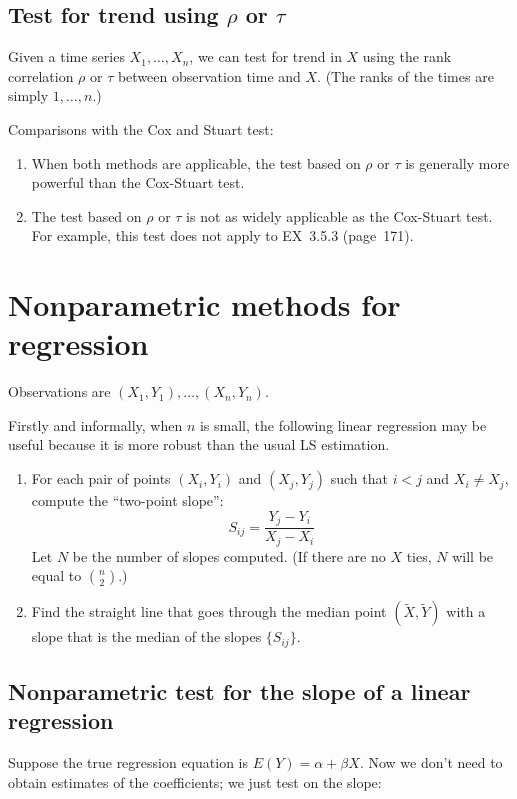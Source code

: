 \documentclass[12pt]{article}
\begin{document}
\subsection{Test for trend using $\rho$ or $\tau$}

Given a time series $X_1,\dotsc,X_n$,
we can test for trend in $X$ using the rank correlation $\rho$ or $\tau$
between observation time and $X$.
(The ranks of the times are simply $1,\dotsc,n$.)

\remark Comparisons with the Cox and Stuart test:
\begin{enumerate}
\item When both methods are applicable, the test based on $\rho$ or
    $\tau$ is generally more powerful than the Cox-Stuart test.
\item The test based on $\rho$ or $\tau$ is not as widely applicable
    as the Cox-Stuart test. For example, this test does not apply
    to EX~3.5.3 (page~171).
\end{enumerate}

\section{Nonparametric methods for regression}

Observations are $(X_1,Y_1),\dotsc, (X_n,Y_n)$.

Firstly and informally, when $n$ is small, the following linear
regression may be useful because it is more robust than the usual LS estimation.

\begin{enumerate}
\item For each pair of points $(X_i,Y_i)$ and $(X_j,Y_j)$ such that
$i<j$ and $X_i\ne X_j$, compute the ``two-point slope'':
\[
S_{ij} = \frac{Y_j - Y_i}{X_j - X_i}
\]
Let $N$ be the number of slopes computed.
(If there are no $X$ ties, $N$ will be equal to $n\choose 2$.)
\item Find the straight line that goes through the median point
$(\tilde{X}, \tilde{Y})$ with a slope that is the median of the slopes
$\{S_{ij}\}$.
\end{enumerate}

\subsection{Nonparametric test for the slope of a linear regression}

Suppose the true regression equation is
$E(Y) = \alpha + \beta X$.
Now we don't need to obtain estimates of the coefficients;
we just test on the slope:
\end{document}
